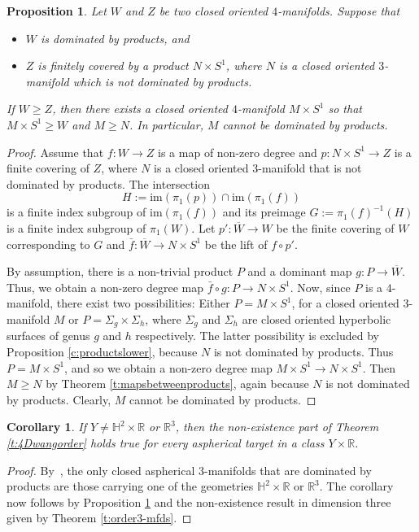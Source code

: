 \documentclass[12pt]{amsart}
\newtheorem{prop}[thm]{Proposition}
\newtheorem{cor}[thm]{Corollary}
\theoremstyle{remark}
\begin{document}
\begin{prop}\label{p:liftingtoproducts}
 Let $W$ and $Z$ be two closed oriented $4$-manifolds. Suppose that 
\begin{itemize}
 \item[\normalfont{(1)}] $W$ is dominated by products, and
 \item[\normalfont{(2)}] $Z$ is finitely covered by a product $N \times S^1$, where $N$ is a closed oriented $3$-manifold which is not dominated by products.
\end{itemize}
 If $W \geq Z$, then there exists a closed oriented $4$-manifold $M \times S^1$ so that $M \times S^1 \geq W$ and $M \geq N$. In particular, $M$ cannot be
dominated by products.
\end{prop}
\begin{proof}
Assume that $f \colon W \longrightarrow Z$ is a map of non-zero degree and $p \colon N \times S^1 \longrightarrow Z$ is a finite covering of $Z$, where $N$ is a closed oriented $3$-manifold that is not dominated by products. The intersection
\[
 H := \mathrm{im} (\pi_1(p)) \cap \mathrm{im} (\pi_1(f)) 
\]
is a finite index subgroup of $\mathrm{im} (\pi_1(f))$ and its preimage $G := \pi_1(f)^{-1}(H)$ is a finite index subgroup of $\pi_1(W)$. Let $p'\colon \overline{W} \longrightarrow W$ be the finite covering of $W$ corresponding to $G$ and $\bar{f} \colon \overline{W} \longrightarrow N \times S^1$ be the lift of $f \circ p'$. 

By assumption, there is a non-trivial product $P$ and a dominant map $g \colon P \longrightarrow \overline{W}$. Thus, we obtain a non-zero degree map $\bar{f} \circ g \colon P \longrightarrow N \times S^1$. Now, since $P$ is a $4$-manifold, there exist two possibilities: Either $P = M\times S^1$, for a closed oriented $3$-manifold $M$ or $P = \Sigma_g \times \Sigma_h$, where $\Sigma_g$ and $\Sigma_h$ are closed oriented hyperbolic surfaces of genus $g$ and $h$ respectively. The latter possibility is excluded by Proposition \ref{c:productslower}, because $N$ is not dominated by products. Thus $P = M \times S^1$, and so we obtain a non-zero degree map $M \times S^1 \longrightarrow N \times S^1$. Then $M \geq N$ by Theorem \ref{t:mapsbetweenproducts}, again because $N$ is not dominated by products. Clearly, $M$ cannot be dominated by products.
\end{proof}

\begin{cor}
If $Y \neq \mathbb{H}^2 \times {\mathbb{R}}$ or ${\mathbb{R}}^3$, then the non-existence part of Theorem \ref{t:4Dwangorder} holds true for every aspherical target in a class $Y \times {\mathbb{R}}$.
 \end{cor}
\begin{proof}
 By~\cite[Theorem 4]{KotschickNeofytidis}, the only closed aspherical $3$-manifolds that are dominated by products are those carrying one of the geometries $\mathbb{H}^2 \times {\mathbb{R}}$ or ${\mathbb{R}}^3$. The corollary now follows by Proposition \ref{p:liftingtoproducts} and the non-existence result in dimension three given by Theorem \ref{t:order3-mfds}.
\end{proof}
\end{document}
